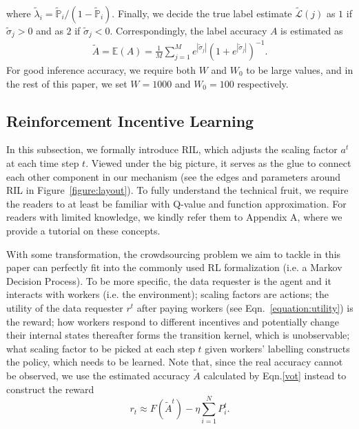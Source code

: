 where $\tilde{\lambda}_i = \tilde{\mathbb{P}}_i/(1-\tilde{\mathbb{P}}_i)$.
Finally, we decide the true label estimate $\tilde{\mathcal{L}}(j)$ as $1$ if $\tilde{\sigma}_j>0$ and as $2$ if $\tilde{\sigma}_j<0$.
Correspondingly, the label accuracy $A$ is estimated as
\begin{equation}
\label{vot}
\begin{split}
\tilde{A}=\mathbb{E}\left(A \right) = \frac{1}{M}{\sum}_{j=1}^{M}e^{|\tilde{\sigma}_j|}\left(1+e^{|\tilde{\sigma}_j|}\right)^{-1}.
\end{split}
\end{equation}
For good inference accuracy, we require both $W$ and $W_0$ to be large values, and in the rest of this paper, we set $W=1000$ and $W_0=100$ respectively.

\subsection{Reinforcement Incentive Learning}
\label{RL}
In this subsection, we formally introduce RIL, which adjusts the scaling factor $a^t$ at each time step $t$. Viewed under the big picture, it serves as the glue to connect each other component in our mechanism (see the edges and parameters around RIL in Figure~\ref{figure:layout}). To fully understand the technical fruit, we require the readers to at least be familiar with Q-value and function approximation. For readers with limited knowledge, we kindly refer them to Appendix A, where we provide a tutorial on these concepts.

With some transformation, the  crowdsourcing problem we aim to tackle in this paper can perfectly fit into the commonly used RL formalization (i.e. a Markov Decision Process). To be more specific, the data requester is the agent and it interacts with workers (i.e. the environment); scaling factors are actions; the utility of the data requester $r^t$ after paying workers (see Eqn.~\ref{equation:utility}) is the reward; how workers respond to different incentives and potentially change their internal states thereafter forms the transition kernel, which is unobservable; what scaling factor to be picked at each step $t$ given workers' labelling constructs the policy, which needs to be learned. Note that, since the real accuracy cannot be observed, we use the estimated accuracy $\tilde{A}$ calculated by Eqn.\ref{vot} instead to construct the reward
\vspace{-2mm}
\begin{equation}
\label{equation:approx_reward}
r_t\approx F(\tilde{A}^t) - \eta {\sum}_{i=1}^{N}P^t_i.
\end{equation}

